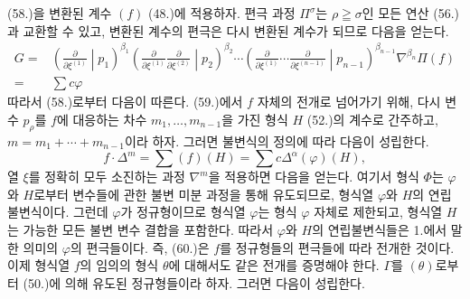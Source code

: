 
(58.)을 변환된 계수 $(f)$ (48.)에 적용하자. 편극 과정 $\Pi^\sigma$는 $\rho\geqq\sigma$인 모든 연산 (56.)과 교환할 수 있고, 변환된 계수의 편극은 다시 변환된 계수가 되므로 다음을 얻는다.
\[
\begin{aligned}
 G={}&\left(\frac{\partial}{\partial\xi^{(1)}}\middle|p_1\right)^{\beta_1}
 \left(\frac{\partial}{\partial\xi^{(1)}}\frac{\partial}{\partial\xi^{(2)}}\middle|p_2\right)^{\beta_2}
 \cdots
 \left(\frac{\partial}{\partial\xi^{(1)}}\cdots\frac{\partial}{\partial\xi^{(n-1)}}\middle|p_{n-1}\right)^{\beta_{n-1}}
 \nabla^{\beta_n}\Pi(f)\\
 ={}&\sum c\varphi
\end{aligned}
\]
따라서 (58.)로부터 다음이 따른다.
(59.)에서 $f$ 자체의 전개로 넘어가기 위해, 다시 변수 $p_\rho$를 $f$에 대응하는 차수 $m_1,\ldots,m_{n-1}$을 가진 형식 $H$ (52.)의 계수로 간주하고, $m=m_1+\cdots+m_{n-1}$이라 하자. 그러면 불변식의 정의에 따라 다음이 성립한다.
\[
 f\cdot\Delta^m=\sum(f)(H)=\sum c\Delta^\alpha(\varphi)(H),
\]
열 $\xi$를 정확히 모두 소진하는 과정 $\nabla^m$을 적용하면 다음을 얻는다.
여기서 형식 $\Phi$는 $\varphi$와 $H$로부터 변수들에 관한 불변 미분 과정을 통해 유도되므로, 형식열 $\varphi$와 $H$의 연립불변식이다. 그런데 $\varphi$가 정규형이므로 형식열 $\varphi$는 형식 $\varphi$ 자체로 제한되고, 형식열 $H$는 가능한 모든 불변 변수 결합을 포함한다. 따라서 $\varphi$와 $H$의 연립불변식들은 1.에서 말한 의미의 $\varphi$의 편극들이다. 즉, (60.)은 $f$를 정규형들의 편극들에 따라 전개한 것이다. 이제 형식열 $f$의 임의의 형식 $\theta$에 대해서도 같은 전개를 증명해야 한다. $\Gamma$를 $(\theta)$로부터 (50.)에 의해 유도된 정규형들이라 하자. 그러면 다음이 성립한다.
